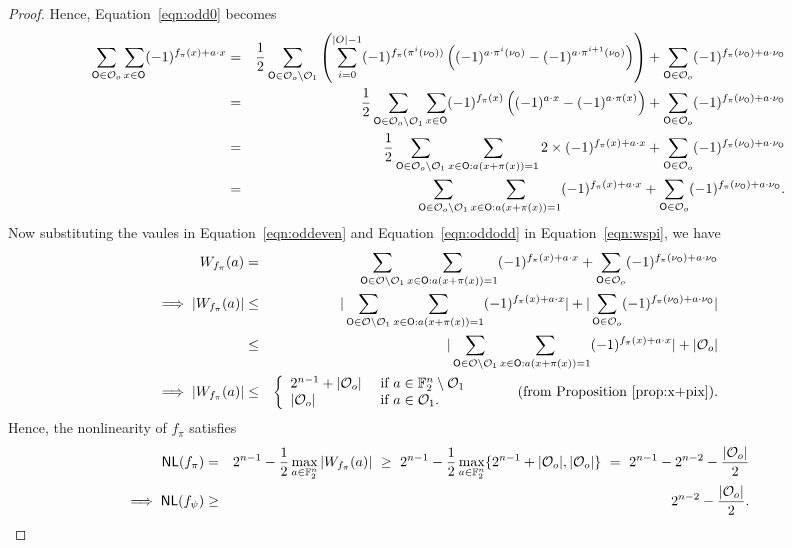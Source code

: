 \documentclass{llncs}
\begin{document}
\begin{proof}
Hence, Equation~\ref{eqn:odd0} becomes
\begin{eqnarray}\label{eqn:oddodd}
\sum_{\mathsf{O} \in \mathcal{O}_o} \sum_{x \in \mathsf{O}} (-1)^{ f_\pi(x) + a \cdot x}
& = & \frac{1}{2}\sum_{\mathsf{O} \in \mathcal{O}_o\setminus\mathcal{O}_1} 
\left(\sum_{i=0}^{|O|-1} (-1)^{f_\pi(\pi^i(\nu_{\mathsf{O}}))}
\left((-1)^{a \cdot \pi^i(\nu_{\mathsf{O}})} - (-1)^{a \cdot \pi^{i+1}(\nu_{\mathsf{O}})}\right)\right) + \sum_{\mathsf{O} \in \mathcal{O}_o} (-1)^{ f_\pi(\nu_{\mathsf{O}}) + a \cdot \nu_{\mathsf{O}}} \nonumber \\
& = & \frac{1}{2}\sum_{\mathsf{O} \in \mathcal{O}_o\setminus\mathcal{O}_1} 
\sum_{x \in \mathsf{O}} (-1)^{f_\pi(x)} \left((-1)^{a \cdot x} - (-1)^{a \cdot \pi(x)}\right) + \sum_{\mathsf{O} \in \mathcal{O}_o} (-1)^{ f_\pi(\nu_{\mathsf{O}}) + a \cdot \nu_{\mathsf{O}}} \nonumber \\
& = & \frac{1}{2}\sum_{\mathsf{O} \in \mathcal{O}_o\setminus\mathcal{O}_1} 
\sum_{x \in \mathsf{O} : a(x+\pi(x)) = 1} 2 \times (-1)^{f_\pi(x)+a\cdot x} + \sum_{\mathsf{O} \in \mathcal{O}_o} (-1)^{ f_\pi(\nu_{\mathsf{O}}) + a \cdot \nu_{\mathsf{O}}} \nonumber \\
& = & \sum_{\mathsf{O} \in \mathcal{O}_o\setminus\mathcal{O}_1} 
\sum_{x \in \mathsf{O} : a(x+\pi(x)) = 1} (-1)^{f_\pi(x)+a\cdot x} + \sum_{\mathsf{O} \in \mathcal{O}_o} (-1)^{ f_\pi(\nu_{\mathsf{O}}) + a \cdot \nu_{\mathsf{O}}}.
\end{eqnarray}
Now substituting the vaules in Equation~\ref{eqn:oddeven} and Equation~\ref{eqn:oddodd} in Equation~\ref{eqn:wspi}, we have
\begin{eqnarray*}\label{eqn:wspi1}
W_{f_\pi}(a) & =  &
\sum_{\mathsf{O} \in \mathcal{O}\setminus\mathcal{O}_1}\sum_{x \in \mathsf{O}: a(x+\pi(x)) = 1}(-1)^{f_\pi(x)+a\cdot x}+\sum_{\mathsf{O} \in \mathcal{O}_o} (-1)^{ f_\pi(\nu_{\mathsf{O}}) + a \cdot \nu_{\mathsf{O}}} \nonumber \\
\implies |W_{f_\pi}(a)| & \leq  &
|\sum_{\mathsf{O} \in \mathcal{O}\setminus\mathcal{O}_1}\sum_{x \in \mathsf{O}: a(x+\pi(x)) = 1}(-1)^{f_\pi(x)+a\cdot x}|+|\sum_{\mathsf{O} \in \mathcal{O}_o} (-1)^{ f_\pi(\nu_{\mathsf{O}}) + a \cdot \nu_{\mathsf{O}}}|\nonumber \\
& \leq  & |\sum_{\mathsf{O} \in \mathcal{O}\setminus\mathcal{O}_1}\sum_{x \in \mathsf{O}: a(x+\pi(x)) = 1}(-1)^{f_\pi(x)+a\cdot x}|+|\mathcal{O}_o|\nonumber \\
\implies |W_{f_\pi}(a)| & \leq  & \left\{  \begin{array}{ll}
        2^{n-1}+ |\mathcal{O}_o| & \text{ if } a \in \mathbb{F}_2^n \setminus \mathcal{O}_1 \\
        |\mathcal{O}_o|        & \text{ if } a \in \mathcal{O}_1.
    \end{array}   \right.  ~~~~~~~~~\text{(from Proposition~\ref{prop:x+pix})}.
\end{eqnarray*}
Hence, the nonlinearity of $f_\pi$ satisfies
\begin{eqnarray*}
\mathsf{NL}(f_\pi) & = & 2^{n-1}-\frac{1}{2} \max_{a\in \mathbb{F}_2^n}| W_{f_\pi}(a)|
~\geq~ 2^{n-1}-\frac{1}{2} \max_{a\in \mathbb{F}_2^n} \{2^{n-1}+|\mathcal{O}_o|,|\mathcal{O}_o| \} ~=~ 2^{n-1} - 2^{n-2} - \frac{|\mathcal{O}_o|}{2} \\
\implies \mathsf{NL}(f_\psi) & \ge & 2^{n-2} - \frac{|\mathcal{O}_o|}{2}.
\end{eqnarray*}
\end{proof}
\end{document}
